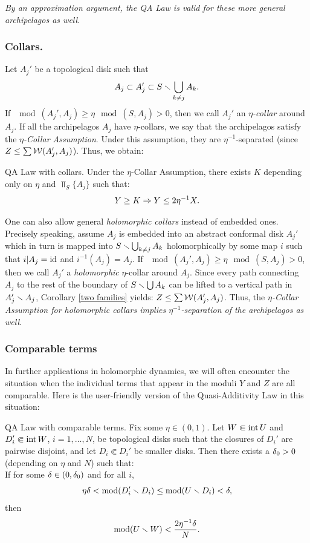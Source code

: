 {\it By an approximation argument, the QA Law is valid for
these more general archipelagos as well.} 


\subsubsection { Collars.}\label{QA Law with collars} 
Let  $A_j' $ be a topological disk such that 
$$
   A_j\subset A_j' \subset S\smallsetminus \bigcup_{k\not=j} A_k.
$$
If $\mod (A_j', A_j)\geq \eta\mod(S, A_j) >0$, then we call $A_j'$ an {\it $\eta$-collar} around $A_j$.    
If all the archipelagos $A_j$ have $\eta$-collars, 
we say that the archipelagos satisfy the {\it $\eta$-Collar Assumption}.
Under this assumption, they are $\eta^{-1}$-separated
(since $Z\leq \sum {\cal W}(A_j', A_j)$). Thus, we obtain:  

\proclaim QA Law with collars.
Under the  $\eta$-Collar Assumption,
there exists $K$ depending only on $\eta$ and $\Top_S\{A_j\}$
 such that:
 $$ Y\geq K \Rightarrow Y\leq 2\eta^{-1} X. $$ 

One can also allow general {\it holomorphic collars} instead of embedded ones.
Precisely speaking, assume $A_j$ is embedded into an abstract conformal disk $A_j'$ which in turn is 
mapped into $S\smallsetminus \bigcup_{k\not= j} A_k $  holomorphically by some  map $i$
such that $i| A_j=\operatorname{id}$ and $i^{-1}(A_j)=A_j$.  
If $\mod (A_j', A_j)\geq \eta \mod (S, A_j) >0$, then we call $A_j'$ a {\it holomorphic} $\eta$-collar around $A_j$.
Since every path connecting $A_j$ to the rest of the boundary of $S\smallsetminus \bigcup A_k$
can be lifted to a vertical path in $A_j'\smallsetminus A_j$,  
Corollary \ref{two families} yields: $Z\leq \sum {\cal W}(A_j', A_j)$. 
Thus, the {\it $\eta$-Collar Assumption for holomorphic collars
implies $\eta^{-1}$-separation of the archipelagos as well}. 

\subsubsection{Comparable terms}

In further applications in  holomorphic dynamics,
we will often encounter the situation when the individual terms that
appear in  the moduli  $Y$ and $Z$ are all comparable.
Here is the user-friendly version of the Quasi-Additivity Law
in this situation:

\proclaim  QA  Law with comparable terms.
    Fix some $\eta\in (0,1)$. 
Let $W\Subset \operatorname{int} U$ and  $D_i'\Subset \operatorname{int} W $, $i=1,\dots, N$, 
be topological disks  such that the closures of $D_i'$ are pairwise disjoint,
and let $D_i\Subset D_i'$ be smaller disks. 
Then there exists a ${\delta}_0 > 0$ (depending on $\eta$ and $N$) such that: \\
If  for some ${\delta}\in (0, {\delta}_0)$ and for all $i$, 
$$
           \eta{\delta} <  \operatorname{mod}(D_i'\smallsetminus D_i)  \leq \operatorname{mod} (U \smallsetminus D_i) < {\delta},   
$$
    then
$$
  \operatorname{mod}(U \smallsetminus W) < \frac{2\eta^{-1} {\delta}}{N}.
$$



